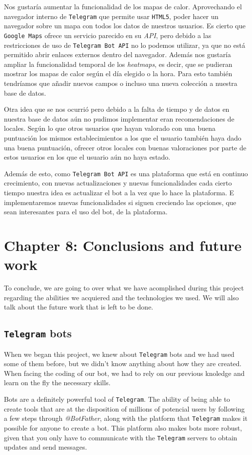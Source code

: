 \documentclass[oneside]{memoir}
\newcommand{\mychapter}[2]{
    \setcounter{chapter}{#1}
    \setcounter{section}{0}
    \chapter*{#2}
    \addcontentsline{toc}{chapter}{#2}
}
\begin{document}
Nos gustaría aumentar la funcionalidad de los mapas de calor. Aprovechando el navegador interno de \texttt{Telegram} que permite usar \texttt{HTML5}, poder hacer un navegador sobre un mapa con todos los datos de nuestros usuarios. Es cierto que \texttt{Google Maps} ofrece un servicio parecido en su \textit{API}, pero debido a las restricciones de uso de \texttt{Telegram Bot API} no lo podemos utilizar, ya que no está permitido abrir enlaces externos dentro del navegador. Además nos gustaría ampliar la funcionalidad temporal de los \textit{heatmaps}, es decir, que se pudieran mostrar los mapas de calor según el día elegido o la hora. Para esto también tendríamos que añadir nuevos campos o incluso una nueva colección a nuestra base de datos.

Otra idea que se nos ocurrió pero debido a la falta de tiempo y de datos en nuestra base de datos aún no pudimos implementar eran recomendaciones de locales. Según lo que otros usuarios que hayan valorado con una buena puntuación los mismos establecimientos a los que el usuario también haya dado una buena puntuación, ofrecer otros locales con buenas valoraciones por parte de estos usuarios en los que el usuario aún no haya estado.

Además de esto, como \texttt{Telegram Bot API} es una plataforma que está en continuo crecimiento, con nuevas actualizaciones y nuevas funcionalidades cada cierto tiempo nuestra idea es actualizar el bot a la vez que lo hace la plataforma. E implementaremos nuevas funcionalidades si siguen creciendo las opciones, que sean interesantes para el uso del bot, de la plataforma.

\newpage
\mychapter{8}{Chapter 8: Conclusions and future work}
To conclude, we are going to over what we have acomplished during this project regarding the abilities we acquiered and the technologies we used. We will also talk about the future work that is left to be done.

\section{\texttt{Telegram} bots}
When we began this project, we knew about \texttt{Telegram} bots and we had used some of them before, but we didn't know anything about how they are created. When facing the coding of our bot, we had to rely on our previous knoledge and learn on the fly the necessary skills.

Bots are a definitely powerful tool of \texttt{Telegram}. The ability of being able to create tools that are at the disposition of millions of potencial users by following a few steps through \textit{@BotFather}, along with the platform that \texttt{Telegram} makes it possible for anyone to create a bot. This platform also makes bots more robust, given that you only have to communicate with the \texttt{Telegram} servers to obtain updates and send messages.
\end{document}
